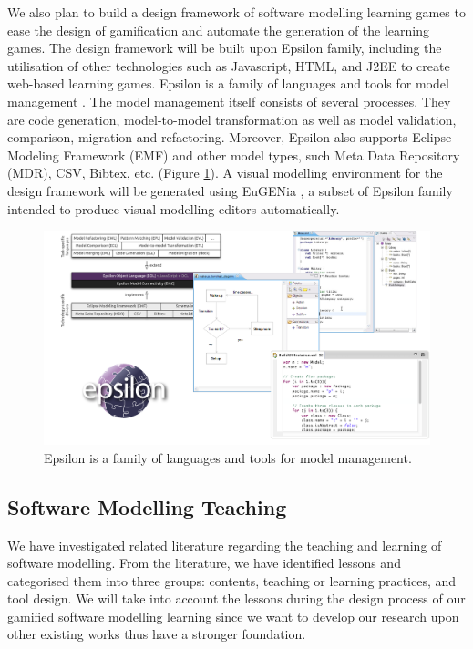 \documentclass[12pt, a4paper]{report}
\begin{document}
We also plan to build a design framework of software modelling learning games to ease the design of gamification and automate the generation of the learning games. The design framework will be built upon Epsilon family, including the utilisation of other technologies such as Javascript, HTML, and J2EE to create web-based learning games. Epsilon is a family of languages and tools for model management \cite{kolovos2010epsilon}. The model management itself consists of several processes. They are code generation, model-to-model transformation as well as model validation, comparison, migration and refactoring. Moreover, Epsilon also supports Eclipse Modeling Framework (EMF) and other model types, such Meta Data Repository (MDR), CSV, Bibtex, etc. (Figure \ref{epsilon}). A visual modelling environment for the design framework will be generated using EuGENia \cite{kolovos2015eugenia}, a subset of Epsilon family intended to produce visual modelling editors automatically. 

\begin{figure}[ht]
\centering
\includegraphics[width=\textwidth]{epsilon}
\caption{Epsilon is a family of languages and tools for model management\cite{kolovos2010epsilon}.}
\label{epsilon}
\end{figure}

\subsection{Software Modelling Teaching}
\label{Software Modelling Teaching}
We have investigated related literature regarding the teaching and learning of software modelling. From the literature, we have identified lessons and categorised them into three groups: contents, teaching or learning practices, and tool design. We will take into account the lessons during the design process of our gamified software modelling learning since we want to develop our research upon other existing works thus have a stronger foundation. 
\end{document}
